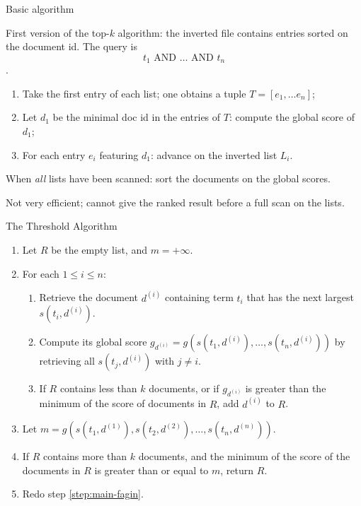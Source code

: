 \begin{frame}{Basic algorithm}

First version of the top-$k$ algorithm: the inverted file contains entries
sorted on the document id. The query is \[t_1\text{ AND }\dots\text{ AND }t_n\].

\begin{enumerate}
\item Take the first entry of each list; one obtains a tuple $T = [e_1, \ldots
e_n]$;
\item Let $d_1$ be the minimal doc id in the entries of $T$: compute the global
score of $d_1$;
 \item For each entry $e_i$ featuring $d_1$: advance on the inverted list $L_i$.
\end{enumerate}

When \emph{all} lists have been scanned: sort the documents on the global
scores.
\vfill

Not very efficient; cannot give the ranked result before a full scan on the
lists.
\end{frame}

\begin{frame}{The Threshold Algorithm}
\begin{enumerate}
\item Let $R$ be the empty list, and $m=+\infty$.
\item For each $1\leq i\leq n$:
\label{step:main-fagin}
\begin{enumerate}
\item Retrieve the document $d^{(i)}$ containing term
$t_i$ that has the \alert{next largest} $s(t_i,d^{(i)})$.
\item Compute its global score
$g_{d^{(i)}}=g(s(t_1,d^{(i)}),\dots,s(t_n,d^{(i)}))$
by retrieving all $s(t_j,d^{(i)})$ with $j\neq i$.
\item If $R$ contains less
than $k$ documents, or if $g_{d^{(i)}}$ is greater than the \alert{minimum of
the score of
documents} in $R$, add $d^{(i)}$ to $R$.
\end{enumerate}
\item Let $m=g(s(t_1,d^{(1)}),s(t_2,d^{(2)}),\dots,s(t_n,d^{(n)}))$.
\item If $R$
contains more than $k$ documents, and the minimum of the score of the
documents in $R$ is \alert{greater than or equal} to $m$, return $R$.
\item Redo step \ref{step:main-fagin}.
\end{enumerate}
\end{frame}

